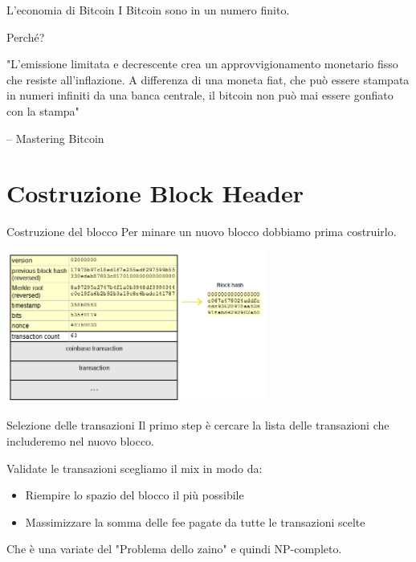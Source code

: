 \documentclass[aspectratio=169]{beamer}
\begin{document}
\begin{frame}{L'economia di Bitcoin}
    I Bitcoin sono in un numero finito.
    
    Perché?

    "L’emissione limitata e decrescente crea un approvvigionamento monetario fisso che resiste all’inflazione. A differenza di una moneta fiat, che può essere stampata in numeri infiniti da una banca centrale, il bitcoin non può mai essere gonfiato con la stampa"

    -- Mastering Bitcoin
\end{frame}

\section{Costruzione Block Header}

\begin{frame}{Costruzione del blocco}
    Per minare un nuovo blocco dobbiamo prima costruirlo.
    \begin{center}
        \includegraphics[height=5cm]{blocco_struct.png}
    \end{center}
\end{frame}

\begin{frame}{Selezione delle transazioni}
    Il primo step è cercare la lista delle transazioni che includeremo nel nuovo blocco.

    Validate le transazioni scegliamo il mix in modo da:
    \begin{itemize}
        \item Riempire lo spazio del blocco il più possibile
        \item Massimizzare la somma delle fee pagate da tutte le transazioni scelte
    \end{itemize}
    Che è una variate del "Problema dello zaino" e quindi NP-completo.
\end{frame}
\end{document}
